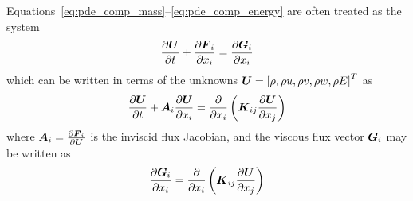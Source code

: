 \documentclass[compress,11pt]{beamer}
\begin{document}
\frame
{
  Equations~\eqref{eq:pde_comp_mass}--\eqref{eq:pde_comp_energy} are often treated as the system
  \begin{equation}
    \label{eq:pde_comp}
    {\frac{\partial{{\boldsymbol{U}}}}{\partial{t}}} + {\frac{\partial{{\boldsymbol{F}}_i}}{\partial{x_i}}} = {\frac{\partial{{\boldsymbol{G}}_i}}{\partial{x_i}}}
  \end{equation}
  which can be written in terms of the unknowns ${\boldsymbol{U}}=\left[\rho, \rho u, \rho v, \rho w, \rho E\right]^T$ as
  \begin{equation}
    \label{eq:pde_comp2}
    {\frac{\partial{{\boldsymbol{U}}}}{\partial{t}}} + {\boldsymbol{A}}_i {\frac{\partial{{\boldsymbol{U}}}}{\partial{x_i}}} =
    {\frac{\partial{}}{\partial{x_i}}} \left( {\boldsymbol{K}}_{ij} {\frac{\partial{{\boldsymbol{U}}}}{\partial{x_j}}} \right)
  \end{equation}
  where ${\boldsymbol{A}}_i = {\frac{\partial{{\boldsymbol{F}}_i}}{\partial{{\boldsymbol{U}}}}}$ is the inviscid flux Jacobian, and the viscous flux vector ${\boldsymbol{G}}_i$ may be written as
  \begin{equation}
    \label{eq:viscous_flux_jacobian}
    {\frac{\partial{{\boldsymbol{G}}_i}}{\partial{x_i}}} = {\frac{\partial{}}{\partial{x_i}}} \left( {\boldsymbol{K}}_{ij} {\frac{\partial{{\boldsymbol{U}}}}{\partial{x_j}}} \right)
  \end{equation}
  \normalsize
}


\end{document}
